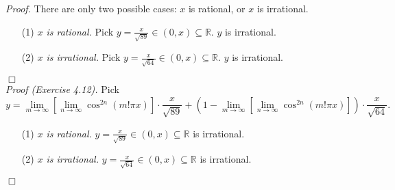 \documentclass{article}
\begin{document}
\emph{Proof.}
There are only two possible cases: $x$ is rational, or $x$ is irrational.
\begin{enumerate}
\item[(1)]
\emph{$x$ is rational.}
Pick $y = \frac{x}{\sqrt{89}} \in (0, x) \subseteq \mathbb{R}$. $y$ is irrational.
\item[(2)]
\emph{$x$ is irrational.}
Pick $y = \frac{x}{\sqrt{64}} \in (0, x) \subseteq \mathbb{R}$. $y$ is irrational.
\end{enumerate}
$\Box$ \\

\emph{Proof (Exercise 4.12).}
Pick
$$y
= \lim_{m \rightarrow \infty}[\lim_{n \rightarrow \infty} \cos^{2n}(m!\pi x)]
\cdot \frac{x}{\sqrt{89}}
+
(1 - \lim_{m \rightarrow \infty}[\lim_{n \rightarrow \infty} \cos^{2n}(m!\pi x)])
\cdot \frac{x}{\sqrt{64}}.$$
\begin{enumerate}
\item[(1)]
\emph{$x$ is rational.}
$y = \frac{x}{\sqrt{89}} \in (0, x) \subseteq \mathbb{R}$ is irrational.
\item[(2)]
\emph{$x$ is irrational.}
$y = \frac{x}{\sqrt{64}} \in (0, x) \subseteq \mathbb{R}$ is irrational.
\end{enumerate}
$\Box$ \\\\
\end{document}
